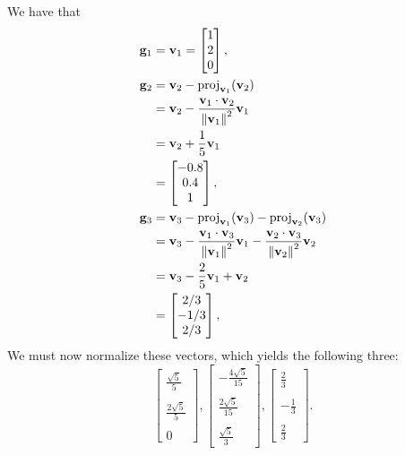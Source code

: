 \documentclass[11pt]{article}
\renewcommand{\vec}[1]{\mathbf{#1}}
\begin{document}
We have that
\begin{align*}
	\vec{g}_{1} &= \vec{v}_{1} = \begin{bmatrix} 1 \\ 2 \\ 0 \end{bmatrix}, \\
	\vec{g}_{2} &= \vec{v}_{2} - \operatorname{proj}_{\vec{v}_{1}}(\vec{v}_{2}) \\
				&= \vec{v}_{2} - \frac{\vec{v}_{1} \cdot \vec{v}_{2}}{\norm{\vec{v}_{1}}^{2}} \vec{v}_{1} \\
				&= \vec{v}_{2} + \frac{1}{5} \vec{v}_{1} \\
				&= \begin{bmatrix} -0.8 \\ 0.4 \\ 1 \end{bmatrix}, \\
	\vec{g}_{3} &= \vec{v}_{3} - \operatorname{proj}_{\vec{v}_{1}}(\vec{v}_{3}) - \operatorname{proj}_{\vec{v}_{2}}(\vec{v}_{3}) \\
				&= \vec{v}_{3} - \frac{\vec{v}_{1} \cdot \vec{v}_{3}}{\norm{\vec{v}_{1}}^{2}}\vec{v}_{1} - \frac{\vec{v}_{2}\cdot \vec{v}_{3}}{\norm{\vec{v}_{2}}^{2}} \vec{v}_{2} \\
				&= \vec{v}_{3} - \frac{2}{5} \vec{v}_{1} + \vec{v}_{2} \\
				&= \begin{bmatrix} 2/3 \\ -1/3 \\ 2/3 \end{bmatrix},
\end{align*}
We must now normalize these vectors, which yields the following three:
\[
	\boxed{ \begin{bmatrix} \tfrac{\sqrt{5}}{5} \\  \\ \tfrac{2\sqrt{5}}{5} \\ \\ 0 \end{bmatrix}, \begin{bmatrix} -\frac{4 \sqrt{5}}{15} \\\\ \frac{2\sqrt{5}}{15} \\\\ \frac{\sqrt{5}}{3} \end{bmatrix}, \begin{bmatrix} \frac{2}{3} \\\\ -\frac{1}{3} \\\\ \frac{2}{3} \end{bmatrix}}.
\]
\end{document}
